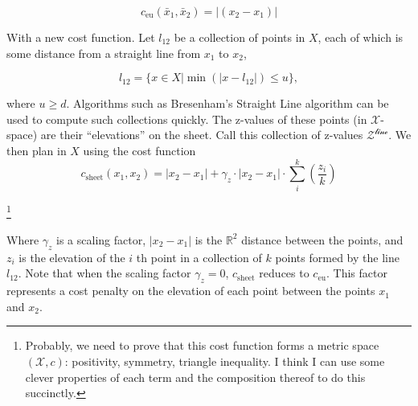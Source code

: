\documentclass[letterpaper, 12pt]{article}
\begin{document}
\begin{equation}
c_\text{eu}(\bar{x}_1, \bar{x}_2) = |(x_2 - x_1)|
\end{equation}


With a new cost function. Let $l_{12}$ be a collection of points in $X$, each of which is some distance from a straight line from $x_1$ to $x_2$,

\begin{equation}
l_{12} = \{x \in X | \min(|x - l_{12}|) \leq u \},
\end{equation}

where $u \geq d$. Algorithms such as Bresenham's Straight Line algorithm can be used to compute such collections quickly. The z-values of these points (in $\mathcal{X}$-space) are their ``elevations'' on the sheet. Call this collection of z-values $\mathcal{Z^\text{line}}$. We then plan in $X$ using the cost function
\begin{equation}
c_\text{sheet}(x_1, x_2) = |x_2 - x_1| + \gamma_z \cdot |x_2 - x_1| \cdot \sum^k_i({\frac{z_i}{k}})
\end{equation}

\footnote{
Probably, we need to prove that this cost function forms a metric space $(\mathcal{X}, c)$: positivity, symmetry,  triangle inequality. I think I can use some clever properties of each term and the composition thereof to do this succinctly.}

Where $\gamma_z$ is a scaling factor, $|x_2-x_1|$ is the $\mathbb{R}^2$ distance between the points, and $z_i$ is the elevation of the $i$ th point in a collection of $k$ points formed by the line $l_{12}$. Note that when the scaling factor $\gamma_z=0$, $c_\text{sheet}$ reduces to $c_\text{eu}$. This factor represents a cost penalty on the elevation of each point between the points $x_1$ and $x_2$. 
\end{document}
